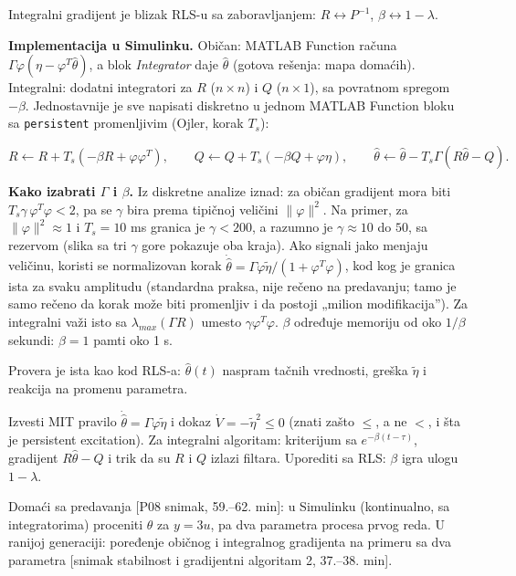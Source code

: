 \documentclass[11pt,a4paper,parskip=half,headsepline,numbers=noenddot]{scrartcl}
\DeclareRobustCommand{\izvor}[1]{{\small\color{izvorC}[#1]}}
\begin{document}
Integralni gradijent je blizak RLS-u sa zaboravljanjem: \(R \leftrightarrow P^{-1}\), \(\beta \leftrightarrow 1 - \lambda\).

\textbf{Implementacija u Simulinku.} Običan: MATLAB Function računa \(\Gamma\varphi(\eta - \varphi^T\hat\theta)\), a blok \emph{Integrator} daje \(\hat\theta\) (gotova rešenja: mapa domaćih). Integralni: dodatni integratori za \(R\) (\(n\times n\)) i \(Q\) (\(n\times 1\)), sa povratnom spregom \(-\beta\). Jednostavnije je sve napisati diskretno u jednom MATLAB Function bloku sa \texttt{persistent} promenljivim (Ojler, korak \(T_s\)):

\[R \leftarrow R + T_s(-\beta R + \varphi\varphi^T),\qquad Q \leftarrow Q + T_s(-\beta Q + \varphi\eta),\qquad \hat\theta \leftarrow \hat\theta - T_s\Gamma(R\hat\theta - Q).\]

\textbf{Kako izabrati \(\Gamma\) i \(\beta\).} Iz diskretne analize iznad: za običan gradijent mora biti \(T_s\gamma\,\varphi^T\varphi < 2\), pa se \(\gamma\) bira prema tipičnoj veličini \(\|\varphi\|^2\). Na primer, za \(\|\varphi\|^2 \approx 1\) i \(T_s = 10\) ms granica je \(\gamma < 200\), a razumno je \(\gamma \approx 10\) do \(50\), sa rezervom (slika sa tri \(\gamma\) gore pokazuje oba kraja). Ako signali jako menjaju veličinu, koristi se normalizovan korak \(\dot{\hat\theta} = \Gamma\varphi\tilde\eta/(1 + \varphi^T\varphi)\), kod kog je granica ista za svaku amplitudu (standardna praksa, nije rečeno na predavanju; tamo je samo rečeno da korak može biti promenljiv i da postoji „milion modifikacija''). Za integralni važi isto sa \(\lambda_{max}(\Gamma R)\) umesto \(\gamma\varphi^T\varphi\). \(\beta\) određuje memoriju od oko \(1/\beta\) sekundi: \(\beta = 1\) pamti oko 1 s.

Provera je ista kao kod RLS-a: \(\hat\theta(t)\) naspram tačnih vrednosti, greška \(\tilde\eta\) i reakcija na promenu parametra.

\begin{ispit}
Izvesti MIT pravilo \(\dot{\hat\theta} = \Gamma\varphi\tilde\eta\) i dokaz \(\dot V = -\tilde\eta^2 \le 0\) (znati zašto \(\le\), a ne \(<\), i šta je persistent excitation). Za integralni algoritam: kriterijum sa \(e^{-\beta(t-\tau)}\), gradijent \(R\hat\theta - Q\) i trik da su \(R\) i \(Q\) izlazi filtara. Uporediti sa RLS: \(\beta\) igra ulogu \(1-\lambda\).

Domaći sa predavanja \izvor{P08 snimak, 59.--62. min}: u Simulinku (kontinualno, sa integratorima) proceniti \(\theta\) za \(y = 3u\), pa dva parametra procesa prvog reda. U ranijoj generaciji: poređenje običnog i integralnog gradijenta na primeru sa dva parametra \izvor{snimak stabilnost i gradijentni algoritam 2, 37.--38. min}.
\end{ispit}
\end{document}
